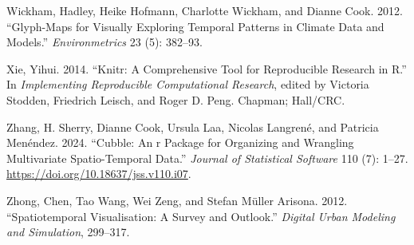\begin{CSLReferences}{1}{0}
\leavevmode{}%
Wickham, Hadley, Heike Hofmann, Charlotte Wickham, and Dianne Cook. 2012. {``Glyph-Maps for Visually Exploring Temporal Patterns in Climate Data and Models.''} \emph{Environmetrics} 23 (5): 382--93.

\leavevmode{}%
Xie, Yihui. 2014. {``Knitr: A Comprehensive Tool for Reproducible Research in {R}.''} In \emph{Implementing Reproducible Computational Research}, edited by Victoria Stodden, Friedrich Leisch, and Roger D. Peng. Chapman; Hall/CRC.

\leavevmode{}%
Zhang, H. Sherry, Dianne Cook, Ursula Laa, Nicolas Langrené, and Patricia Menéndez. 2024. {``Cubble: An r Package for Organizing and Wrangling Multivariate Spatio-Temporal Data.''} \emph{Journal of Statistical Software} 110 (7): 1--27. \url{https://doi.org/10.18637/jss.v110.i07}.

\leavevmode{}%
Zhong, Chen, Tao Wang, Wei Zeng, and Stefan Müller Arisona. 2012. {``Spatiotemporal Visualisation: A Survey and Outlook.''} \emph{Digital Urban Modeling and Simulation}, 299--317.

\end{CSLReferences}


\address{%
Maliny Po\\
Monash University\\%
Department of Econometrics and Business Statistics\\ Melbourne, Australia\\
%
%
\textit{ORCiD: \href{https://orcid.org/0009-0008-4686-6631}{0009-0008-4686-6631}}\\%
\href{mailto:malinypo12@gmail.com}{\nolinkurl{malinypo12@gmail.com}}%
}

\address{%
Nathan Shuyuan Yang\\
Duke University\\%
Durham, North Carolina\\
%
%
\textit{ORCiD: \href{https://orcid.org/0009-0002-9985-1042}{0009-0002-9985-1042}}\\%
\href{mailto:nathan.s.yang@gmail.com}{\nolinkurl{nathan.s.yang@gmail.com}}%
}

\address{%
H. Sherry Zhang\\
University of Texas at Austin\\%
Department of Statistics and Data Sciences\\ Austin, Texas\\
%
%
\textit{ORCiD: \href{https://orcid.org/0000-0002-7122-1463}{0000-0002-7122-1463}}\\%
\href{mailto:huizezhangsh@gmail.com}{\nolinkurl{huizezhangsh@gmail.com}}%
}

\address{%
Dianne Cook\\
Monash University\\%
Department of Econometrics and Business Statistics\\ Melbourne, Australia\\
%
%
\textit{ORCiD: \href{https://orcid.org/0000-0002-3813-7155}{0000-0002-3813-7155}}\\%
\href{mailto:dicook@monash.edu}{\nolinkurl{dicook@monash.edu}}%
}
